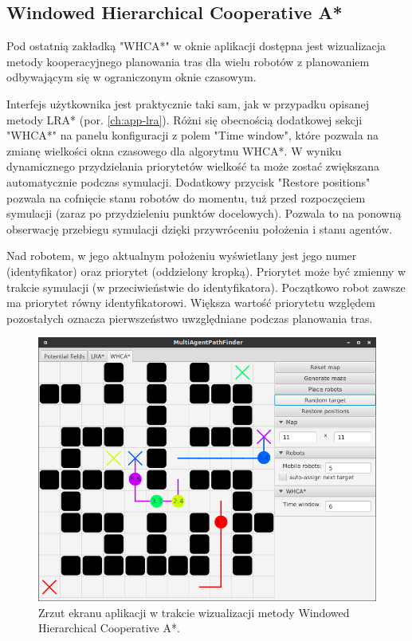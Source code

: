 \subsection{Windowed Hierarchical Cooperative A*}
Pod ostatnią zakładką "WHCA*" w oknie aplikacji dostępna jest wizualizacja metody kooperacyjnego planowania tras dla wielu robotów z planowaniem odbywającym się w ograniczonym oknie czasowym.

Interfejs użytkownika jest praktycznie taki sam, jak w przypadku opisanej metody LRA* (por. \ref{ch:app-lra}).
Różni się obecnością dodatkowej sekcji "WHCA*" na panelu konfiguracji z polem "Time window", które pozwala na zmianę wielkości okna czasowego dla algorytmu WHCA*. W wyniku dynamicznego przydzielania priorytetów wielkość ta może zostać zwiększana automatycznie podczas symulacji.
Dodatkowy przycisk "Restore positions" pozwala na cofnięcie stanu robotów do momentu, tuż przed rozpoczęciem symulacji (zaraz po przydzieleniu punktów docelowych). Pozwala to na ponowną obserwację przebiegu symulacji dzięki przywróceniu położenia i stanu agentów.

Nad robotem, w jego aktualnym położeniu wyświetlany jest jego numer (identyfikator) oraz priorytet (oddzielony kropką). Priorytet może być zmienny w trakcie symulacji (w przeciwieństwie do identyfikatora). Początkowo robot zawsze ma priorytet równy identyfikatorowi. Większa wartość priorytetu względem pozostałych oznacza pierwszeństwo uwzględniane podczas planowania tras.

\begin{figure}
	\centering
	\includegraphics[width=0.8\columnwidth]{img/robopath/ui-whca}
	\caption{Zrzut ekranu aplikacji w trakcie wizualizacji metody Windowed Hierarchical Cooperative A*.}
	\label{fig:robopath-ui-whca}
\end{figure}
